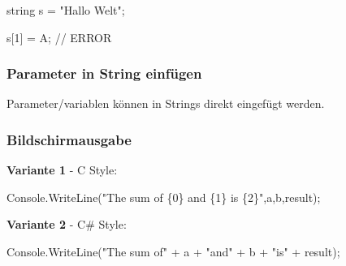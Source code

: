 \documentclass[
  10pt,
  a4paperpaper,
  DIV=11,
  numbers=noendperiod]{scrartcl}
\newenvironment{Shaded}{}{}
\newcommand{\CharTok}[1]{\textcolor[rgb]{0.01,0.18,0.38}{#1}}
\newcommand{\CommentTok}[1]{\textcolor[rgb]{0.42,0.45,0.49}{#1}}
\newcommand{\DataTypeTok}[1]{\textcolor[rgb]{0.84,0.23,0.29}{#1}}
\newcommand{\DecValTok}[1]{\textcolor[rgb]{0.00,0.36,0.77}{#1}}
\newcommand{\FunctionTok}[1]{\textcolor[rgb]{0.44,0.26,0.76}{#1}}
\newcommand{\NormalTok}[1]{\textcolor[rgb]{0.14,0.16,0.18}{#1}}
\newcommand{\OperatorTok}[1]{\textcolor[rgb]{0.14,0.16,0.18}{#1}}
\newcommand{\StringTok}[1]{\textcolor[rgb]{0.01,0.18,0.38}{#1}}
\begin{document}
\begin{multicols}{2}
\begin{tcolorbox}
\begin{Shaded}
\begin{Highlighting}[]
\DataTypeTok{string}\NormalTok{ s }\OperatorTok{=} \StringTok{"Hallo Welt"}\OperatorTok{;}

\NormalTok{s}\OperatorTok{[}\DecValTok{1}\OperatorTok{]} \OperatorTok{=} \CharTok{\textquotesingle{}A\textquotesingle{}}\OperatorTok{;} \CommentTok{// ERROR}
\end{Highlighting}
\end{Shaded}

\end{tcolorbox}

\hypertarget{parameter-in-string-einfuxfcgen}{%
\subsubsection{Parameter in String
einfügen}\label{parameter-in-string-einfuxfcgen}}

Parameter/variablen können in Strings direkt eingefügt werden.

\end{multicols}

\hypertarget{bildschirmausgabe}{%
\subsubsection{Bildschirmausgabe}\label{bildschirmausgabe}}

\textbf{Variante 1} - C Style:

\begin{Shaded}
\begin{Highlighting}[]
\NormalTok{Console}\OperatorTok{.}\FunctionTok{WriteLine}\OperatorTok{(}\StringTok{"The sum of \{0\} and \{1\} is \{2\}"}\OperatorTok{,}\NormalTok{a}\OperatorTok{,}\NormalTok{b}\OperatorTok{,}\NormalTok{result}\OperatorTok{);}
\end{Highlighting}
\end{Shaded}

\textbf{Variante 2} - C\# Style:

\begin{Shaded}
\begin{Highlighting}[]
\NormalTok{Console}\OperatorTok{.}\FunctionTok{WriteLine}\OperatorTok{(}\StringTok{"The sum of"} \OperatorTok{+}\NormalTok{ a }\OperatorTok{+} \StringTok{"and"} \OperatorTok{+}\NormalTok{ b }\OperatorTok{+} \StringTok{"is"} \OperatorTok{+}\NormalTok{ result}\OperatorTok{);}
\end{Highlighting}
\end{Shaded}
\end{document}
